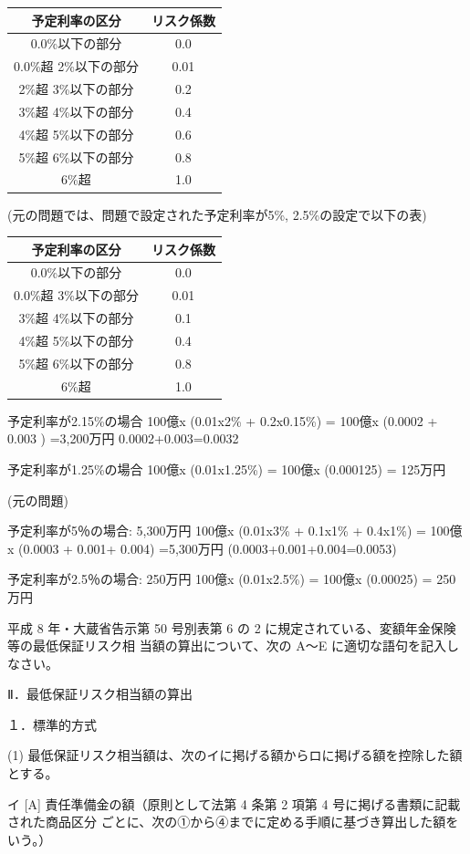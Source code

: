 \documentclass[report,gutter=10mm,fore-edge=10mm,uplatex,dvipdfmx]{jlreq}
\begin{document}
\begin{tabular}{|c|c|}
\hline 予定利率の区分& リスク係数\\ \hline
 0.0\%以下の部分&0.0 \\
 0.0\%超 2\%以下の部分&0.01 \\
 2\%超 3\%以下の部分&0.2 \\
 3\%超 4\%以下の部分&0.4 \\
 4\%超 5\%以下の部分&0.6 \\
 5\%超 6\%以下の部分&0.8 \\
 6\%超 &1.0 \\
\hline
\end{tabular}

(元の問題では、問題で設定された予定利率が5\%, 2.5\%の設定で以下の表)

\begin{tabular}{|c|c|}
\hline 予定利率の区分& リスク係数\\ \hline
 0.0\%以下の部分&0.0 \\
 0.0\%超 3\%以下の部分&0.01 \\
 3\%超 4\%以下の部分&0.1 \\
 4\%超 5\%以下の部分&0.4 \\
 5\%超 6\%以下の部分&0.8 \\
 6\%超 &1.0 \\ \hline
\end{tabular}

\answer{}
予定利率が2.15\%の場合
100億x (0.01x2\% + 0.2x0.15\%) = 100億x (0.0002 + 0.003 ) =3,200万円
0.0002+0.003=0.0032

予定利率が1.25\%の場合
100億x (0.01x1.25\%) = 100億x (0.000125) = 125万円

(元の問題)

予定利率が5％の場合: 5,300万円
100億x (0.01x3\% + 0.1x1\% + 0.4x1\%) = 100億x (0.0003 + 0.001+ 0.004) =5,300万円
(0.0003+0.001+0.004=0.0053)

予定利率が2.5％の場合: 250万円
100億x (0.01x2.5\%) = 100億x (0.00025) = 250万円

平成 8 年・大蔵省告示第 50 号別表第 6 の 2 に規定されている、変額年金保険等の最低保証リスク相
当額の算出について、次の A～E に適切な語句を記入しなさい。

Ⅱ．最低保証リスク相当額の算出

１．標準的方式

(1) 最低保証リスク相当額は、次のイに掲げる額からロに掲げる額を控除した額とする。

イ [A] 責任準備金の額（原則として法第 4 条第 2 項第 4 号に掲げる書類に記載された商品区分
ごとに、次の①から④までに定める手順に基づき算出した額をいう。）
\end{document}
